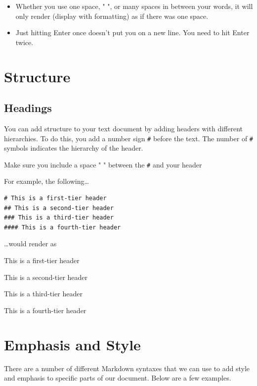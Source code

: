 \documentclass[
]{book}
\providecommand{\tightlist}{%
  \setlength{\itemsep}{0pt}\setlength{\parskip}{0pt}}
\begin{document}
\begin{itemize}
\tightlist
\item
  Whether you use one space, " ", or many spaces in between your words, it will only render (display with formatting) as if there was one space.
\item
  Just hitting \textquotesingle Enter\textquotesingle{} once doesn't put you on a new line. You need to hit \textquotesingle Enter\textquotesingle{} twice.
\end{itemize}

\hypertarget{structure-1}{%
\section{Structure}\label{structure-1}}

\hypertarget{headings}{%
\subsection*{Headings}\label{headings}}

You can add structure to your text document by adding headers with different hierarchies. To do this, you add a number sign \texttt{\#} before the text. The number of \texttt{\#} symbols indicates the hierarchy of the header.

Make sure you include a space " " between the \texttt{\#} and your header

For example, the following\ldots{}

\begin{verbatim}
# This is a first-tier header
## This is a second-tier header
### This is a third-tier header
#### This is a fourth-tier header
\end{verbatim}

\ldots would render as

This is a first-tier header

This is a second-tier header

This is a third-tier header

This is a fourth-tier header

\hypertarget{emphasis-and-style}{%
\section{Emphasis and Style}\label{emphasis-and-style}}

There are a number of different Markdown syntaxes that we can use to add style and emphasis to specific parts of our document. Below are a few examples.
\end{document}
